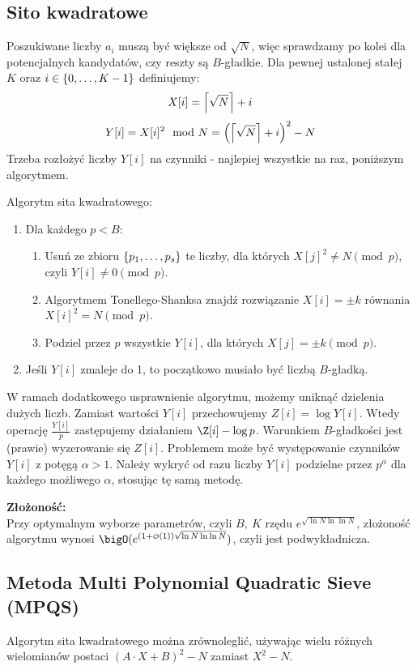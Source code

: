 \subsection{Sito kwadratowe}
Poszukiwane liczby \( a_i \) muszą być większe od \( \sqrt{N} \), więc sprawdzamy po kolei dla potencjalnych kandydatów, czy reszty są \( B \)-gładkie.
Dla pewnej ustalonej stałej \( K \) oraz \( i \in \set{0, \dots, K-1} \) definiujemy:
\[ X[i] = \left\lceil\sqrt{N}\right\rceil + i \]
\[ Y[i] = X[i]^2 \mod N = \left(\left\lceil\sqrt{N}\right\rceil + i\right)^2 - N \]
Trzeba rozłożyć liczby \( Y[i] \) na czynniki - najlepiej wszystkie na raz, poniższym algorytmem.
\begin{greyframe}
    Algorytm sita kwadratowego:
    \begin{enumerate}
        \item Dla każdego \( p < B \):
        \begin{enumerate}
            \item Usuń ze zbioru \( \set{p_1, \dots, p_s} \) te liczby, dla których \( X[j]^2 \neq N \pmod{p} \), \\ czyli \( Y[i] \neq 0 \pmod{p} \).
            \item Algorytmem Tonellego-Shanksa znajdź rozwiązanie \( X[i] = \pm k \) równania \\ \( X[i]^2 = N \pmod{p} \).
            \item Podziel przez \( p \) wszystkie \( Y[i] \), dla których \( X[j] = \pm k \pmod{p} \).
        \end{enumerate}
        \item Jeśli \( Y[i] \) zmaleje do 1, to początkowo musiało być liczbą \( B \)-gładką.
    \end{enumerate}
\end{greyframe}
W ramach dodatkowego usprawnienie algorytmu, możemy uniknąć dzielenia dużych liczb. Zamiast wartości \( Y[i] \) przechowujemy \( Z[i] = \log Y[i] \).
Wtedy operację \( \frac{Y[i]}{p} \) zastępujemy działaniem \( \Z[i] - \log p \). Warunkiem \( B \)-gładkości jest (prawie) wyzerowanie się \( Z[i] \).
Problemem może być występowanie czynników \( Y[i] \) z potęgą \( \alpha > 1 \). Należy wykryć od razu liczby \( Y[i] \) podzielne przez \( p^{\alpha} \) dla każdego możliwego \( \alpha \), stosując tę samą metodę.

\textbf{Złożoność:} \\
Przy optymalnym wyborze parametrów, czyli \( B, \ K \) rzędu \( e^{\sqrt{\ln N \ln\ln N}} \), złożoność algorytmu wynosi \( \bigO(e^{(1 + {\scriptscriptstyle\mathcal{O}}(1))\sqrt{\ln N \ln\ln N}}) \), czyli jest podwykładnicza.

\subsection{Metoda Multi Polynomial Quadratic Sieve (MPQS)}
Algorytm sita kwadratowego można zrównoleglić, używając wielu różnych wielomianów postaci \( (A \cdot X + B)^2 - N \) zamiast \( X^2 - N \).